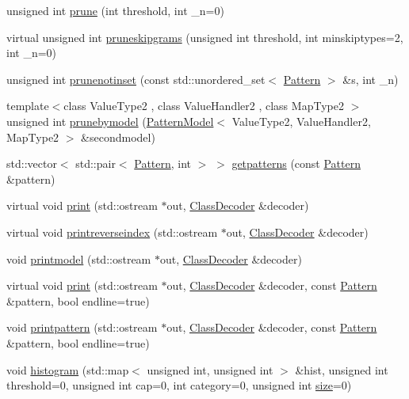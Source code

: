 \begin{DoxyCompactItemize}
\item 
unsigned int \hyperlink{classPatternModel_a3698c1c47789b2fb2eae65d96ed4e3ab}{prune} (int threshold, int \+\_\+n=0)
\item 
virtual unsigned int \hyperlink{classPatternModel_a30da80bd942ab1bac95ac9945f465702}{pruneskipgrams} (unsigned int threshold, int minskiptypes=2, int \+\_\+n=0)
\item 
unsigned int \hyperlink{classPatternModel_ab4429ca9cb19f12e4b0bb7b8cb0e6fe7}{prunenotinset} (const std\+::unordered\+\_\+set$<$ \hyperlink{classPattern}{Pattern} $>$ \&s, int \+\_\+n)
\item 
{\footnotesize template$<$class Value\+Type2 , class Value\+Handler2 , class Map\+Type2 $>$ }\\unsigned int \hyperlink{classPatternModel_a787ccf34c969a5e14aa2e1bdcb164ee7}{prunebymodel} (\hyperlink{classPatternModel}{Pattern\+Model}$<$ Value\+Type2, Value\+Handler2, Map\+Type2 $>$ \&secondmodel)
\item 
std\+::vector$<$ std\+::pair$<$ \hyperlink{classPattern}{Pattern}, int $>$ $>$ \hyperlink{classPatternModel_ad5d110daa1691b266ad325b1a2f7a842}{getpatterns} (const \hyperlink{classPattern}{Pattern} \&pattern)
\item 
virtual void \hyperlink{classPatternModel_a6d645bd24603696e77d6904c09d9b39c}{print} (std\+::ostream $\ast$out, \hyperlink{classClassDecoder}{Class\+Decoder} \&decoder)
\item 
virtual void \hyperlink{classPatternModel_aa5d23339ceb528e9cb7a02640bce392c}{printreverseindex} (std\+::ostream $\ast$out, \hyperlink{classClassDecoder}{Class\+Decoder} \&decoder)
\item 
void \hyperlink{classPatternModel_a30b0bf9471b82119000b38c620ffc21e}{printmodel} (std\+::ostream $\ast$out, \hyperlink{classClassDecoder}{Class\+Decoder} \&decoder)
\item 
virtual void \hyperlink{classPatternModel_a58bbe1d44c4daf8560872f97d124a836}{print} (std\+::ostream $\ast$out, \hyperlink{classClassDecoder}{Class\+Decoder} \&decoder, const \hyperlink{classPattern}{Pattern} \&pattern, bool endline=true)
\item 
void \hyperlink{classPatternModel_aaa497ee9bd6b1abe6ab4451fbf7272f4}{printpattern} (std\+::ostream $\ast$out, \hyperlink{classClassDecoder}{Class\+Decoder} \&decoder, const \hyperlink{classPattern}{Pattern} \&pattern, bool endline=true)
\item 
void \hyperlink{classPatternModel_a72c97f76cca2ba56099eb1559a7b0ddd}{histogram} (std\+::map$<$ unsigned int, unsigned int $>$ \&hist, unsigned int threshold=0, unsigned int cap=0, int category=0, unsigned int \hyperlink{classPatternModel_a25f387acaf981af9962195bd05b3e7e2}{size}=0)

\end{DoxyCompactItemize}
